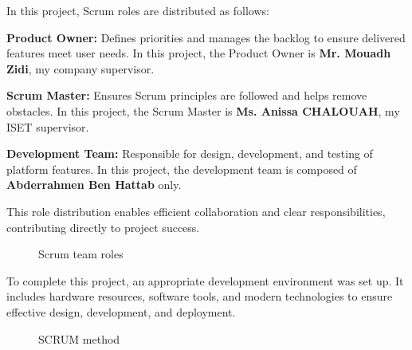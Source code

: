 {\fontsize{12}{18}\selectfont
\setlength{\parindent}{1.2cm}
\setlength{\parskip}{6pt}

\indent In this project, Scrum roles are distributed as follows:

\begin{itemize}[leftmargin=2cm, itemsep=4pt]
  {\fontsize{12}{18}\selectfont
  \item \textbf{Product Owner:} Defines priorities and manages the backlog to ensure delivered features meet user needs. In this project, the Product Owner is \textbf{Mr. Mouadh Zidi}, my company supervisor.
  \item \textbf{Scrum Master:} Ensures Scrum principles are followed and helps remove obstacles. In this project, the Scrum Master is \textbf{Ms. Anissa CHALOUAH}, my ISET supervisor.
  \item \textbf{Development Team:} Responsible for design, development, and testing of platform features. In this project, the development team is composed of \textbf{Abderrahmen Ben Hattab} only.
  }
\end{itemize}

\indent This role distribution enables efficient collaboration and clear responsibilities, contributing directly to project success.

}

\vspace{6pt}

\begin{figure}[H]
  \centering
  \caption{Scrum team roles}
\end{figure}

\vspace{6pt}


{\fontsize{12}{18}\selectfont
\setlength{\parindent}{1.2cm}
\setlength{\parskip}{6pt}

\indent To complete this project, an appropriate development environment was set up. It includes hardware resources, software tools, and modern technologies to ensure effective design, development, and deployment.

}

\begin{figure}[H]
  \centering
  \caption{SCRUM method}
\end{figure}

